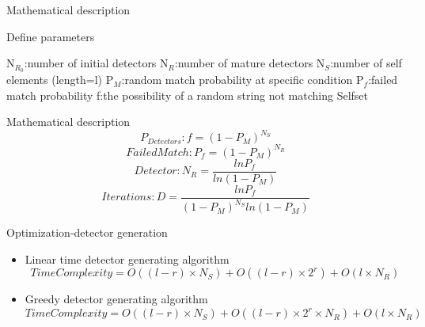 \begin{frame}{Mathematical description}
 \begin{algorithm}[H]
  \caption{Define parameters}          
    \begin{algorithmic}  
       \STATE N$_{R_0}$:number of initial detectors
       \STATE N$_{R}$:number of mature detectors 
       \STATE N$_{S}$:number of self elements (length=l)
       \STATE P$_{M}$:random match probability at specific condition
       \STATE P$_{f}$:failed match probability
       \STATE f:the possibility of a random string not matching Selfset
    \end{algorithmic}
  \end{algorithm} 
\end{frame}

\begin{frame}{Mathematical description}
  \begin{equation}
     P_{Detectors}: f=(1-P_{M})^{N_{S}}
  \end{equation}
  \begin{equation}
     FailedMatch:P_f=(1-P_{M})^{N_{R}}
  \end{equation}
  \begin{equation}
     Detector:N_R=\frac{lnP_f}{ln(1-P_M)}
  \end{equation}
  \begin{equation}
     Iterations:D=\frac{lnP_f}{(1-P_{M})^{N_{S}}ln(1-P_M)}
  \end{equation}
  
\end{frame}

\begin{frame}{Optimization-detector generation}
   \begin{itemize}
      \item {
    Linear time detector generating algorithm
      \begin{equation}
        TimeComplexity=O((l-r)\times{N_S})+O((l-r)\times{2^r})+O(l\times{N_R})
      \end{equation}
    }
      \item {
    Greedy detector generating algorithm
     \begin{equation}
        TimeComplexity=O((l-r)\times{N_S})+O((l-r)\times{2^r}\times{N_R})+O(l\times{N_R})
     \end{equation}
    }
  \end{itemize}
\end{frame}


